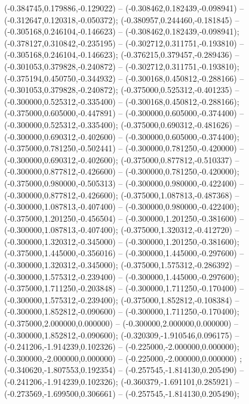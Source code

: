  (-0.384745,0.179886,-0.129022) -- (-0.308462,0.182439,-0.098941) -- (-0.312647,0.120318,-0.050372);
 (-0.380957,0.244460,-0.181845) -- (-0.305168,0.246104,-0.146623) -- (-0.308462,0.182439,-0.098941);
 (-0.378127,0.310842,-0.235195) -- (-0.302712,0.311751,-0.193810) -- (-0.305168,0.246104,-0.146623);
 (-0.376215,0.379457,-0.289436) -- (-0.301053,0.379828,-0.240872) -- (-0.302712,0.311751,-0.193810);
 (-0.375194,0.450750,-0.344932) -- (-0.300168,0.450812,-0.288166) -- (-0.301053,0.379828,-0.240872);
 (-0.375000,0.525312,-0.401235) -- (-0.300000,0.525312,-0.335400) -- (-0.300168,0.450812,-0.288166);
 (-0.375000,0.605000,-0.447891) -- (-0.300000,0.605000,-0.374400) -- (-0.300000,0.525312,-0.335400);
 (-0.375000,0.690312,-0.481626) -- (-0.300000,0.690312,-0.402600) -- (-0.300000,0.605000,-0.374400);
 (-0.375000,0.781250,-0.502441) -- (-0.300000,0.781250,-0.420000) -- (-0.300000,0.690312,-0.402600);
 (-0.375000,0.877812,-0.510337) -- (-0.300000,0.877812,-0.426600) -- (-0.300000,0.781250,-0.420000);
 (-0.375000,0.980000,-0.505313) -- (-0.300000,0.980000,-0.422400) -- (-0.300000,0.877812,-0.426600);
 (-0.375000,1.087813,-0.487368) -- (-0.300000,1.087813,-0.407400) -- (-0.300000,0.980000,-0.422400);
 (-0.375000,1.201250,-0.456504) -- (-0.300000,1.201250,-0.381600) -- (-0.300000,1.087813,-0.407400);
 (-0.375000,1.320312,-0.412720) -- (-0.300000,1.320312,-0.345000) -- (-0.300000,1.201250,-0.381600);
 (-0.375000,1.445000,-0.356016) -- (-0.300000,1.445000,-0.297600) -- (-0.300000,1.320312,-0.345000);
 (-0.375000,1.575312,-0.286392) -- (-0.300000,1.575312,-0.239400) -- (-0.300000,1.445000,-0.297600);
 (-0.375000,1.711250,-0.203848) -- (-0.300000,1.711250,-0.170400) -- (-0.300000,1.575312,-0.239400);
 (-0.375000,1.852812,-0.108384) -- (-0.300000,1.852812,-0.090600) -- (-0.300000,1.711250,-0.170400);
 (-0.375000,2.000000,0.000000) -- (-0.300000,2.000000,0.000000) -- (-0.300000,1.852812,-0.090600);
 (-0.320309,-1.910546,0.096175) -- (-0.241206,-1.914239,0.102326) -- (-0.225000,-2.000000,0.000000);
 (-0.300000,-2.000000,0.000000) -- (-0.225000,-2.000000,0.000000) ;
 (-0.340620,-1.807553,0.192354) -- (-0.257545,-1.814130,0.205490) -- (-0.241206,-1.914239,0.102326);
 (-0.360379,-1.691101,0.285921) -- (-0.273569,-1.699500,0.306661) -- (-0.257545,-1.814130,0.205490);
